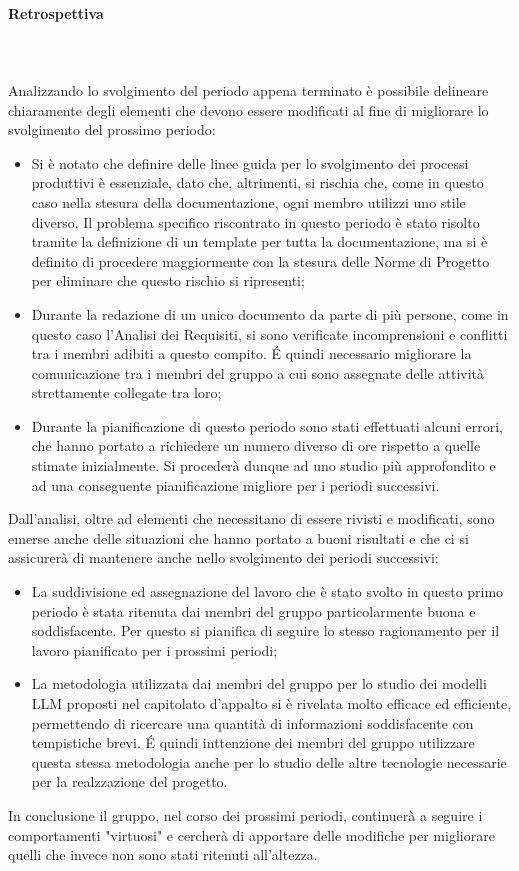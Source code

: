 \paragraph{Retrospettiva} \hspace{1cm} 
\\ \hspace{1cm} \\
Analizzando lo svolgimento del periodo appena terminato è possibile delineare chiaramente degli elementi che devono essere modificati al fine di migliorare lo svolgimento del prossimo periodo:
\begin{itemize}
    \item Si è notato che definire delle linee guida per lo svolgimento dei processi produttivi è essenziale, dato che, altrimenti, si rischia che, come in questo caso nella stesura della documentazione, ogni membro utilizzi uno stile diverso. Il problema specifico riscontrato in questo periodo è stato risolto tramite la definizione di un template per tutta la documentazione, ma si è definito di procedere maggiormente con la stesura delle Norme di Progetto per eliminare che questo rischio si ripresenti;
    \item Durante la redazione di un unico documento da parte di più persone, come in questo caso l'Analisi dei Requisiti, si sono verificate incomprensioni e conflitti tra i membri adibiti a questo compito. \'E quindi necessario migliorare la comunicazione tra i membri del gruppo a cui sono assegnate delle attività strettamente collegate tra loro;
    \item Durante la pianificazione di questo periodo sono stati effettuati alcuni errori, che hanno portato a richiedere un numero diverso di ore rispetto a quelle stimate inizialmente. Si procederà dunque ad uno studio più approfondito e ad una conseguente pianificazione migliore per i periodi successivi.
\end{itemize}
Dall'analisi, oltre ad elementi che necessitano di essere rivisti e modificati, sono emerse anche delle situazioni che hanno portato a buoni risultati e che ci si assicurerà di mantenere anche nello svolgimento dei periodi successivi:
\begin{itemize}
    \item La suddivisione ed assegnazione del lavoro che è stato svolto in questo primo periodo è stata ritenuta dai membri del gruppo particolarmente buona e soddisfacente. Per questo si pianifica di seguire lo stesso ragionamento per il lavoro pianificato per i prossimi periodi;
    \item La metodologia utilizzata dai membri del gruppo per lo studio dei modelli LLM proposti nel capitolato d'appalto si è rivelata molto efficace ed efficiente, permettendo di ricercare una quantità di informazioni soddisfacente con tempistiche brevi. \'E quindi inttenzione dei membri del gruppo utilizzare questa stessa metodologia anche per lo studio delle altre tecnologie necessarie per la realzzazione del progetto.
\end{itemize}
In conclusione il gruppo, nel corso dei prossimi periodi, continuerà a seguire i comportamenti "virtuosi" e cercherà di apportare delle modifiche per migliorare quelli che invece non sono stati ritenuti all'altezza.

